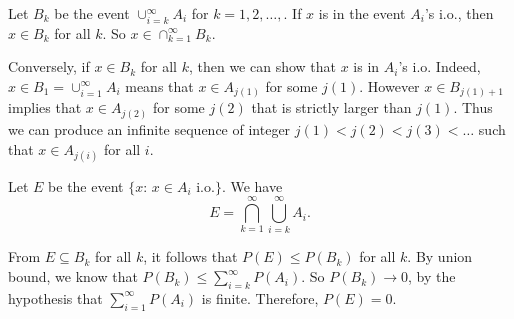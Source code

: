 \documentclass[12pt]{article}
\begin{document}
Let $B_k$ be the event $\cup_{i=k}^\infty A_i$ for
$k=1,2,\ldots,$. If $x$ is in the event $A_i$'s i.o., then $x\in
B_k$ for all $k$. So $x\in \cap_{k=1}^\infty B_k$.

Conversely, if $x\in B_k$ for all $k$, then we can show that $x$
is in $A_i$'s i.o. Indeed, $x\in B_1 = \cup_{i=1}^\infty A_i$
means that $x\in A_{j(1)}$ for some $j(1)$. However $x\in
B_{j(1)+1}$ implies that $x\in A_{j(2)}$ for some $j(2)$ that is
strictly larger than $j(1)$. Thus we can produce an infinite
sequence of integer $j(1)<j(2)<j(3)<\ldots$ such that $x\in
A_{j(i)}$ for all $i$.

Let $E$ be the event $\{x:\, x\in A_i \mbox{ i.o.}\}$. We have
\[
 E = \bigcap_{k=1}^\infty \bigcup_{i=k}^\infty A_i.
\]

From $E\subseteq B_k$ for all $k$, it follows that $P(E)\leq
P(B_k)$ for all $k$. By union bound, we know that $P(B_k)\leq
\sum_{i=k}^\infty P(A_i)$. So $P(B_k)\rightarrow 0$, by the
hypothesis that $\sum_{i=1}^\infty P(A_i)$ is finite. Therefore, $P(E)=0$.
\end{document}
